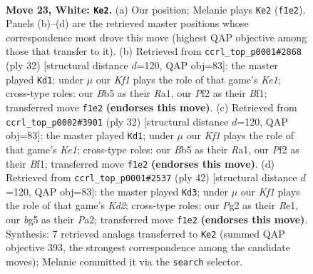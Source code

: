 \documentclass[11pt]{article}
\begin{document}
\clearpage

\begin{figure}[p]\centering
\begin{subfigure}{0.46\textwidth}\centering
\resizebox{\linewidth}{!}{%
\newchessgame
\chessboard[
  setfen={rn2k3/2Qb4/3p4/pB1Pppb1/6p1/8/PPP2PP1/R1B1RK1r w q - 1 23},
  showmover=false,
  pgfstyle=straightmove, color=movearrow, markmove={f1-e2}
]}
\caption{}
\end{subfigure}\hfill
\begin{subfigure}{0.46\textwidth}\centering
\resizebox{\linewidth}{!}{%
\newchessgame
\chessboard[
  setfen={r1b1k2r/p4p2/2p1p3/1P6/2pQ4/2N5/1Pn2PPP/R3KB1R w KQkq - 1 17},
  showmover=false,
  pgfstyle=straightmove, color=movearrow, markmove={e1-d1}
]}
\caption{}
\end{subfigure}
\\[4pt]
\begin{subfigure}{0.46\textwidth}\centering
\resizebox{\linewidth}{!}{%
\newchessgame
\chessboard[
  setfen={r1b1k2r/p4p2/2p1p3/1P6/2pQ4/2N5/1Pn2PPP/R3KB1R w KQkq - 1 17},
  showmover=false,
  pgfstyle=straightmove, color=movearrow, markmove={e1-d1}
]}
\caption{}
\end{subfigure}\hfill
\begin{subfigure}{0.46\textwidth}\centering
\resizebox{\linewidth}{!}{%
\newchessgame
\chessboard[
  setfen={r1bk1b2/4p1p1/2ppB3/5pQ1/p7/2P5/Pq1K1PPP/3RR3 w - - 1 22},
  showmover=false,
  pgfstyle=straightmove, color=movearrow, markmove={d2-d3}
]}
\caption{}
\end{subfigure}
\caption{\textbf{Move 23, White: \texttt{Ke2}.} (a) Our position; Melanie plays \texttt{Ke2} (\texttt{f1e2}). Panels (b)--(d) are the retrieved master positions whose correspondence most drove this move (highest QAP objective among those that transfer to it). (b) Retrieved from \texttt{ccrl\_top\_p0001\#2868} (ply 32) [structural distance $d$=120, QAP obj=83]: the master played \texttt{Kd1}; under $\mu$ our \emph{Kf1} plays the role of that game's \emph{Ke1}; cross-type roles: our \emph{B}b5 as their \emph{R}a1, our \emph{P}f2 as their \emph{B}f1; transferred move \texttt{f1e2} \textbf{(endorses this move)}. (c) Retrieved from \texttt{ccrl\_top\_p0002\#3901} (ply 32) [structural distance $d$=120, QAP obj=83]: the master played \texttt{Kd1}; under $\mu$ our \emph{Kf1} plays the role of that game's \emph{Ke1}; cross-type roles: our \emph{B}b5 as their \emph{R}a1, our \emph{P}f2 as their \emph{B}f1; transferred move \texttt{f1e2} \textbf{(endorses this move)}. (d) Retrieved from \texttt{ccrl\_top\_p0001\#2537} (ply 42) [structural distance $d$=120, QAP obj=83]: the master played \texttt{Kd3}; under $\mu$ our \emph{Kf1} plays the role of that game's \emph{Kd2}; cross-type roles: our \emph{P}g2 as their \emph{R}e1, our \emph{b}g5 as their \emph{P}a2; transferred move \texttt{f1e2} \textbf{(endorses this move)}. Synthesis: 7 retrieved analogs transferred to \texttt{Ke2} (summed QAP objective 393, the strongest correspondence among the candidate moves); Melanie committed it via the \texttt{search} selector.}
\label{fig:thought-m44}
\end{figure}
\end{document}
